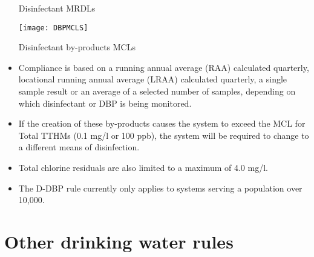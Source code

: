 \begin{itemize}
\begin{table}[]
\begin{center}
\caption{Disinfectant MRDLs}
\label{table:DisinfectantMRDLs}
\end{center}
\end{table}
\begin{table}[]
\begin{center}
\texttt{[image: DBPMCLS]}
\caption{Disinfectant by-products MCLs}
\label{table:DBPMCL}
\end{center}
\end{table}
\item Compliance is based on a running annual average (RAA) calculated quarterly, locational running annual average (LRAA) calculated quarterly, a single sample result or an average of a selected number of samples, depending on which disinfectant or DBP is being monitored.
\item If the creation of these by-products causes the system to exceed the MCL for Total TTHMs (0.1 mg/l or 100 ppb), the system will be required to change to a different means of disinfection. 
\item Total chlorine residuals are also limited to a maximum of 4.0 mg/l. 
\item The D-DBP rule currently only applies to systems serving a population over 10,000.
\end{itemize}
\section{Other drinking water rules}
